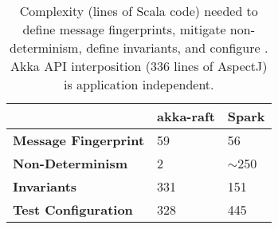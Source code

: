 \begin{table}
\centering
\footnotesize
\begin{tabular}{|l|l|l|}
  \cline{2-3}
  \multicolumn{1}{c|}{~} & \textbf{akka-raft} & \textbf{Spark} \\\cline{2-3} \hline
{\bf Message Fingerprint} & 59 & 56 \\
\hline
{\bf Non-Determinism} & 2 & {\footnotesize $\sim$}250 \\
\hline
{\bf Invariants} & 331 & 151 \\
\hline
{\bf Test Configuration} & 328 & 445 \\
\hline
\end{tabular}
\caption{Complexity (lines of Scala code) needed to define message
fingerprints, mitigate non-determinism, define invariants, and configure \sys.
Akka API interposition (336 lines of AspectJ) is application independent.}
\label{tab:instrumentation}
\end{table}
